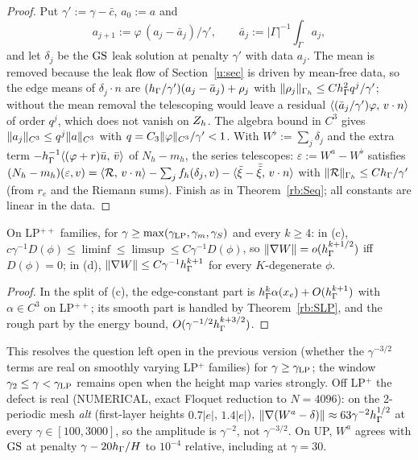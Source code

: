 \begin{proof}
Put $\gamma':=\gamma-\bar c$, $a_0:=a$ and
\[
a_{j+1}:=\varphi\,(a_j-\bar a_j)/\gamma',\qquad \bar a_j:=|\Gamma|^{-1}\textstyle\int_\Gamma a_j,
\]
and let $\delta_j$ be the $\mathrm{GS}$ leak solution at penalty $\gamma'$ with data $a_j$. The mean is removed because the leak flow of Section~\ref{u:sec} is driven by mean-free data, so the edge means of $\delta_j\cdot n$ are $(h_\Gamma/\gamma')(a_j-\bar a_j)+\rho_j$ with $\lVert \rho_j\rVert_{\Gamma_h}\le Ch_\Gamma^2q^j/\gamma'$; without the mean removal the telescoping would leave a residual $\langle (\bar a_j/\gamma')\varphi,\, v\cdot n\rangle$ of order $q^j$, which does not vanish on $Z_h$. The algebra bound in $C^3$ gives $\lVert a_j\rVert_{C^3}\le q^j\lVert a\rVert_{C^3}$ with $q=C_3\lVert \varphi\rVert_{C^3}/\gamma'<1$. With $W^\flat:=\sum_j\delta_j$ and the extra term $-h_\Gamma^{-1}\langle (\varphi+r)\bar u,\, \bar v\rangle$ of $N_h-m_h$, the series telescopes: $\varepsilon:=W^a-W^\flat$ satisfies $(N_h-m_h)(\varepsilon,v)=\langle \mathcal R,\, v\cdot n\rangle-\sum_jf_h(\delta_j,v)-\langle \tilde\xi-\bar{\tilde\xi},\, v\cdot n\rangle$ with $\lVert \mathcal R\rVert_{\Gamma_h}\le Ch_\Gamma/\gamma'$ (from $r_e$ and the Riemann sums). Finish as in Theorem~\ref{rb:Seq}; all constants are linear in the data.
\end{proof}

\begin{corollary}\label{rb:Rc}
On LP$^{++}$ families, for $\gamma\ge\max(\gamma_{\rm LP},\gamma_m,\gamma_S)$ and every $k\ge4$: in (c), $c\gamma^{-1}D(\phi)\le\liminf\le\limsup\le C\gamma^{-1}D(\phi)$, so $\lVert \nabla W\rVert=o(h_\Gamma^{k+1/2})$ iff $D(\phi)=0$; in (d), $\lVert \nabla W\rVert\le C\gamma^{-1}h_\Gamma^{k+1}$ for every $K$-degenerate $\phi$.
\end{corollary}

\begin{proof}
In the split of (c), the edge-constant part is $h_\Gamma^k\alpha(x_e)+O(h_\Gamma^{k+1})$ with $\alpha\in C^3$ on LP$^{++}$; its smooth part is handled by Theorem~\ref{rb:SLP}, and the rough part by the energy bound, $O(\gamma^{-1/2}h_\Gamma^{k+3/2})$.
\end{proof}

This resolves the question left open in the previous version (whether the $\gamma^{-3/2}$ terms are real on smoothly varying LP$^+$ families) for $\gamma\ge\gamma_{\rm LP}$; the window $\gamma_2\le\gamma<\gamma_{\rm LP}$ remains open when the height map varies strongly. Off LP$^+$ the defect is real (NUMERICAL, exact Floquet reduction to $N=4096$): on the 2-periodic mesh \emph{alt} (first-layer heights $0.7|e|$, $1.4|e|$), $\lVert \nabla(W^a-\delta)\rVert\approx63\gamma^{-2}h_\Gamma^{1/2}$ at every $\gamma\in[100,3000]$, so the amplitude is $\gamma^{-2}$, not $\gamma^{-3/2}$. On \textsf{UP}, $W^a$ agrees with $\mathrm{GS}$ at penalty $\gamma-20h_\Gamma/H$ to $10^{-4}$ relative, including at $\gamma=30$.

